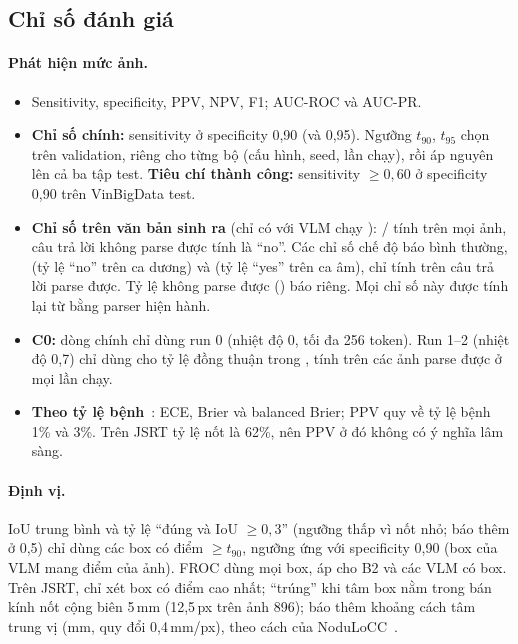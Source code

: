\subsection{Chỉ số đánh giá}

\paragraph{Phát hiện mức ảnh.}
\begin{itemize}
  \item Sensitivity, specificity, PPV, NPV, F1; AUC-ROC và AUC-PR.
  \item \textbf{Chỉ số chính:} sensitivity ở specificity 0,90 (và 0,95). Ngưỡng $t_{90}$, $t_{95}$ chọn trên
        validation, riêng cho từng bộ (cấu hình, seed, lần chạy), rồi áp nguyên lên cả ba tập test.
        \textbf{Tiêu chí thành công:} sensitivity $\ge 0{,}60$ ở specificity 0,90 trên VinBigData test.
  \item \textbf{Chỉ số trên văn bản sinh ra} (chỉ có với VLM chạy ):
        / tính trên mọi ảnh, câu trả lời không parse được tính là ``no''. Các chỉ số
        chế độ báo bình thường,  (tỷ lệ ``no'' trên ca dương) và  (tỷ lệ ``yes''
        trên ca âm), chỉ tính trên câu trả lời parse được. Tỷ lệ không parse được () báo riêng.
        Mọi chỉ số này được tính lại từ  bằng parser hiện hành.
  \item \textbf{C0:} dòng chính chỉ dùng run 0 (nhiệt độ 0, tối đa 256 token). Run 1--2 (nhiệt độ 0,7) chỉ dùng cho
        tỷ lệ đồng thuận trong , tính trên các ảnh parse được ở mọi lần chạy.
  \item \textbf{Theo tỷ lệ bệnh}~\cite{mosquera2024imbalance,kim2023multicentre}: ECE, Brier và balanced Brier;
        PPV quy về tỷ lệ bệnh 1\% và 3\%. Trên JSRT tỷ lệ nốt là 62\%, nên PPV ở đó không có ý nghĩa lâm sàng.
\end{itemize}

\paragraph{Định vị.} IoU trung bình và tỷ lệ ``đúng và IoU $\ge 0{,}3$'' (ngưỡng thấp vì nốt nhỏ; báo thêm ở 0,5)
chỉ dùng các box có điểm $\ge t_{90}$, ngưỡng ứng với specificity 0,90 (box của VLM mang điểm của ảnh). FROC dùng
mọi box, áp cho B2 và các VLM có box. Trên JSRT, chỉ xét box có điểm cao nhất; ``trúng'' khi tâm box nằm trong
bán kính nốt cộng biên 5\,mm (12,5\,px trên ảnh 896); báo thêm khoảng cách tâm trung vị (mm, quy đổi 0,4\,mm/px),
theo cách của NoduLoCC~\cite{mustafic2026noduloc}.

